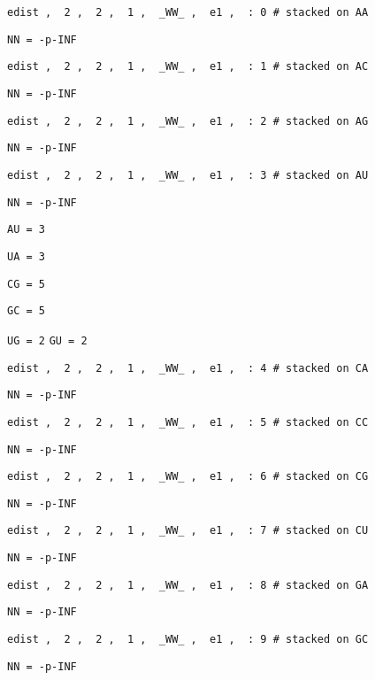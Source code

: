 \begin{footnotesize}
\noindent
  \texttt{edist \sep\, 2 \sep\, 2 \sep\, 1 \sep\, \_WW\_ \sep\, e1 \sep\, : 0 \# stacked on AA}

\noindent\texttt{NN = -p-INF}

\noindent
  \texttt{edist \sep\, 2 \sep\, 2 \sep\, 1 \sep\, \_WW\_ \sep\, e1 \sep\, : 1 \# stacked on AC}

\noindent\texttt{NN = -p-INF}

\noindent
  \texttt{edist \sep\, 2 \sep\, 2 \sep\, 1 \sep\, \_WW\_ \sep\, e1 \sep\, : 2 \# stacked on AG}

\noindent\texttt{NN = -p-INF}

\noindent
  \texttt{edist \sep\, 2 \sep\, 2 \sep\, 1 \sep\, \_WW\_ \sep\, e1 \sep\, : 3 \# stacked on AU}

\noindent\texttt{NN = -p-INF}

\noindent\texttt{AU = 3}

\noindent\texttt{UA = 3}

\noindent\texttt{CG = 5}

\noindent\texttt{GC  = 5}

\noindent\texttt{UG = 2}
\noindent
\texttt{GU = 2}

\noindent 
 \texttt{edist \sep\, 2 \sep\, 2 \sep\, 1 \sep\, \_WW\_ \sep\, e1 \sep\, : 4 \# stacked on CA}

\noindent\texttt{NN = -p-INF}

\noindent 
  \texttt{edist \sep\, 2 \sep\, 2 \sep\, 1 \sep\, \_WW\_ \sep\, e1 \sep\, : 5 \# stacked on CC}

\noindent\texttt{NN = -p-INF}

\noindent 
  \texttt{edist \sep\, 2 \sep\, 2 \sep\, 1 \sep\, \_WW\_ \sep\, e1 \sep\, : 6 \# stacked on CG}

\noindent\texttt{NN = -p-INF}

\noindent 
  \texttt{edist \sep\, 2 \sep\, 2 \sep\, 1 \sep\, \_WW\_ \sep\, e1 \sep\, : 7 \# stacked on CU}

\noindent\texttt{NN = -p-INF}

\noindent 
  \texttt{edist \sep\, 2 \sep\, 2 \sep\, 1 \sep\, \_WW\_ \sep\, e1 \sep\, : 8 \# stacked on GA}

\noindent\texttt{NN = -p-INF}

 \noindent 
 \texttt{edist \sep\, 2 \sep\, 2 \sep\, 1 \sep\, \_WW\_ \sep\, e1 \sep\, : 9 \# stacked on GC}

\noindent\texttt{NN = -p-INF}


\end{footnotesize}
